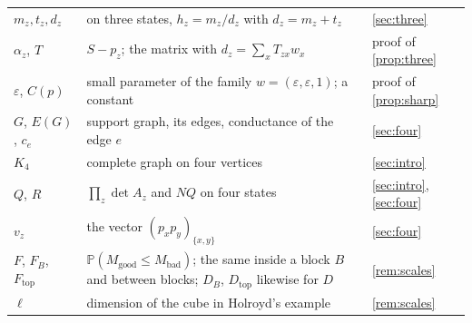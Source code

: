 \documentclass[11pt,a4paper]{article}
\numberwithin{equation}{section}
\theoremstyle{remark}
\newcommand{\Pp}{\mathbb P}
\newcommand{\eps}{\varepsilon}
\newcommand{\good}{M_{\mathrm{good}}}
\newcommand{\bad}{M_{\mathrm{bad}}}
\begin{document}
\begin{center}
\begin{tabular}{lp{}l}
$m_z,t_z,d_z$ & on three states, $h_z=m_z/d_z$ with $d_z=m_z+t_z$ & \cref{sec:three}\\
$\alpha_z$, $T$ & $S-p_z$; the matrix with $d_z=\sum_xT_{zx}w_x$ & proof of \cref{prop:three}\\
$\eps$, $C(p)$ & small parameter of the family $w=(\eps,\eps,1)$; a constant & proof of \cref{prop:sharp}\\
$G$, $E(G)$, $c_e$ & support graph, its edges, conductance of the edge $e$ & \cref{sec:four}\\
$K_4$ & complete graph on four vertices & \cref{sec:intro}\\
$Q$, $R$ & $\prod_z\det A_z$ and $NQ$ on four states & \cref{sec:intro}, \cref{sec:four}\\
$v_z$ & the vector $(p_xp_y)_{\{x,y\}}$ & \cref{sec:four}\\
$F$, $F_B$, $F_{\mathrm{top}}$ & $\Pp(\good\le\bad)$; the same inside a block $B$ and between blocks; $D_B$, $D_{\mathrm{top}}$ likewise for $D$ & \cref{rem:scales}\\
$\ell$ & dimension of the cube in Holroyd's example & \cref{rem:scales}\\
\bottomrule
\end{tabular}
\end{center}
\end{document}
